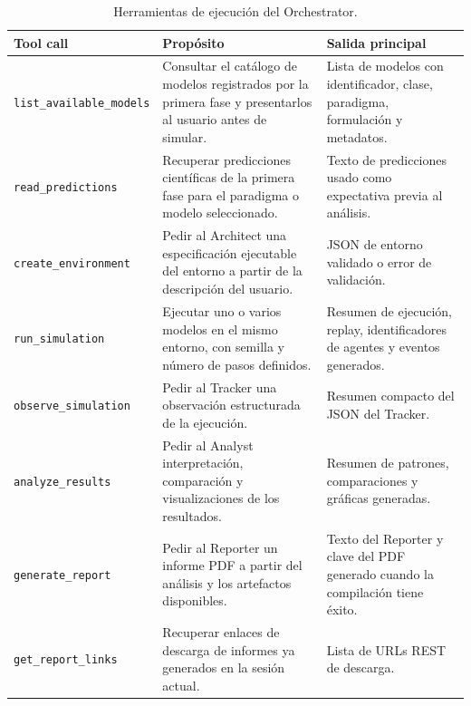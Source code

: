 \begin{table}[H]
\begin{center}
{\scriptsize
\setlength{\tabcolsep}{6pt}
\renewcommand{\arraystretch}{1.12}
\begin{tabular}{|>{\raggedright\arraybackslash}p{3.2cm}|>{\raggedright\arraybackslash}p{5.2cm}|>{\raggedright\arraybackslash}p{4.1cm}|} \hline
\textbf{Tool call} & \textbf{Propósito} & \textbf{Salida principal} \\ \hline
\texttt{list\_available\_models} & Consultar el catálogo de modelos registrados por la primera fase y presentarlos al usuario antes de simular. & Lista de modelos con identificador, clase, paradigma, formulación y metadatos. \\ \hline
\texttt{read\_predictions} & Recuperar predicciones científicas de la primera fase para el paradigma o modelo seleccionado. & Texto de predicciones usado como expectativa previa al análisis. \\ \hline
\texttt{create\_environment} & Pedir al Architect una especificación ejecutable del entorno a partir de la descripción del usuario. & JSON de entorno validado o error de validación. \\ \hline
\texttt{run\_simulation} & Ejecutar uno o varios modelos en el mismo entorno, con semilla y número de pasos definidos. & Resumen de ejecución, replay, identificadores de agentes y eventos generados. \\ \hline
\texttt{observe\_simulation} & Pedir al Tracker una observación estructurada de la ejecución. & Resumen compacto del JSON del Tracker. \\ \hline
\texttt{analyze\_results} & Pedir al Analyst interpretación, comparación y visualizaciones de los resultados. & Resumen de patrones, comparaciones y gráficas generadas. \\ \hline
\texttt{generate\_report} & Pedir al Reporter un informe PDF a partir del análisis y los artefactos disponibles. & Texto del Reporter y clave del PDF generado cuando la compilación tiene éxito. \\ \hline
\texttt{get\_report\_links} & Recuperar enlaces de descarga de informes ya generados en la sesión actual. & Lista de URLs REST de descarga. \\ \hline
\end{tabular}
}
\caption[Herramientas de ejecución del Orchestrator]{Herramientas de ejecución
del Orchestrator.}
\label{tab:toolcalls-orchestrator-ejecucion}
\end{center}
\end{table}

